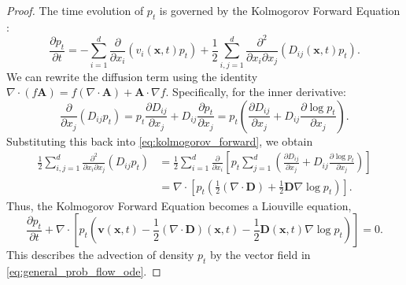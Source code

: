 \documentclass{article}
\theoremstyle{definition}
\begin{document}
\begin{proof}
    The time evolution of $p_t$ is governed by the Kolmogorov Forward Equation \cite[Chapter VII]{revuz_continuous_1999}:
    \begin{equation}
        \frac{\partial p_t}{\partial t} = -\sum_{i=1}^d \frac{\partial}{\partial x_i} \left( v_i(\boldsymbol{x}, t) p_t \right) + \frac{1}{2} \sum_{i,j=1}^d \frac{\partial^2}{\partial x_i \partial x_j} \left( D_{ij}(\boldsymbol{x}, t) p_t \right).
        \label{eq:kolmogorov_forward}
    \end{equation}
    We can rewrite the diffusion term using the identity $\nabla \cdot (f \boldsymbol{A}) = f (\nabla \cdot \boldsymbol{A}) + \boldsymbol{A} \cdot \nabla f$. Specifically, for the inner derivative:
    \begin{equation*}
        \frac{\partial}{\partial x_j} (D_{ij} p_t) = p_t \frac{\partial D_{ij}}{\partial x_j} + D_{ij} \frac{\partial p_t}{\partial x_j} = p_t \left( \frac{\partial D_{ij}}{\partial x_j} + D_{ij} \frac{\partial \log p_t}{\partial x_j} \right).
    \end{equation*}
    Substituting this back into \eqref{eq:kolmogorov_forward}, we obtain
    \begin{align*}
        \frac{1}{2} \sum_{i,j=1}^d \frac{\partial^2}{\partial x_i \partial x_j} (D_{ij} p_t) &= \frac{1}{2} \sum_{i=1}^d \frac{\partial}{\partial x_i} \left[ p_t \sum_{j=1}^d \left( \frac{\partial D_{ij}}{\partial x_j} + D_{ij} \frac{\partial \log p_t}{\partial x_j} \right) \right] \nonumber \\
        &= \nabla \cdot \left[ p_t \left( \frac{1}{2}(\nabla \cdot \mathbf{D}) + \frac{1}{2}\mathbf{D} \nabla \log p_t \right) \right].
    \end{align*}
    Thus, the Kolmogorov Forward Equation becomes a Liouville equation,
    \begin{equation*}
        \frac{\partial p_t}{\partial t} + \nabla \cdot \left[ p_t \left( \mathbf{v}(\boldsymbol{x}, t) - \frac{1}{2}(\nabla \cdot \mathbf{D})(\boldsymbol{x}, t) - \frac{1}{2} \mathbf{D}(\boldsymbol{x}, t) \nabla \log p_t \right) \right] = 0.
    \end{equation*}
    This describes the advection of density $p_t$ by the vector field in \eqref{eq:general_prob_flow_ode}.
\end{proof}
\end{document}
